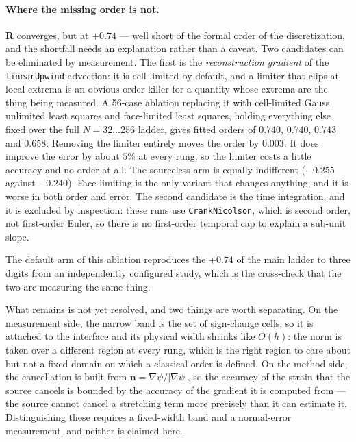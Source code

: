 \documentclass[preprint,3p,11pt]{elsarticle}
\newcommand{\psilev}{\psi}
\newcommand{\gradpsi}{\lvert\nabla\psilev\rvert}
\begin{document}
\paragraph{Where the missing order is not.}
\label{par:ablation}
\textbf{R} converges, but at $+0.74$ --- well short of the formal order of the
discretization, and the shortfall needs an explanation rather than a caveat.
Two candidates can be eliminated by measurement. The first is the
\emph{reconstruction gradient} of the \texttt{linearUpwind} advection: it is
cell-limited by default, and a limiter that clips at local extrema is an
obvious order-killer for a quantity whose extrema are the thing being measured.
A 56-case ablation replacing it with cell-limited Gauss, unlimited least
squares and face-limited least squares, holding everything else fixed over the
full $N = 32\ldots256$ ladder, gives fitted orders of $0.740$, $0.740$, $0.743$
and $0.658$. Removing the limiter entirely moves the order by $0.003$. It does
improve the error by about $5\%$ at every rung, so the limiter costs a little
accuracy and no order at all. The sourceless arm is equally indifferent
($-0.255$ against $-0.240$). Face limiting is the only variant that changes
anything, and it is worse in both order and error. The second candidate is the
time integration, and it is excluded by inspection: these runs use
\texttt{CrankNicolson}, which is second order, not first-order Euler, so there
is no first-order temporal cap to explain a sub-unit slope.

The default arm of this ablation reproduces the $+0.74$ of the main ladder to
three digits from an independently configured study, which is the cross-check
that the two are measuring the same thing.

What remains is not yet resolved, and two things are worth separating. On the
measurement side, the narrow band is the set of sign-change cells, so it is
attached to the interface and its physical width shrinks like $O(h)$: the norm
is taken over a different region at every rung, which is the right region to
care about but not a fixed domain on which a classical order is defined. On the
method side, the cancellation is built from $\mathbf{n} = \nabla\psilev/\gradpsi$,
so the accuracy of the strain that the source cancels is bounded by the accuracy
of the gradient it is computed from --- the source cannot cancel a stretching
term more precisely than it can estimate it. Distinguishing these requires a
fixed-width band and a normal-error measurement, and neither is claimed here.
\end{document}
